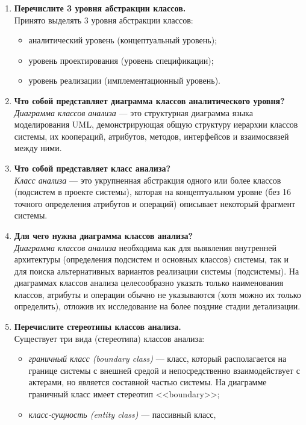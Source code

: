 \begin{enumerate}
	\item \textbf{Перечислите 3 уровня абстракции классов.}\\
		Принято выделять 3 уровня абстракции классов:
		\begin{itemize}
			\item аналитический уровень (концептуальный уровень);
			\item уровень проектирования (уровень спецификации);
			\item уровень реализации (имплементационный уровень).
		\end{itemize}
	\item \textbf{Что собой представляет диаграмма классов
		аналитического уровня?}\\
		\textit{Диаграмма классов анализа} --- это структурная диаграмма языка
		моделирования UML, демонстрирующая общую структуру иерархии классов
		системы, их коопераций, атрибутов, методов, интерфейсов
		и взаимосвязей между ними.
	\item \textbf{Что собой представляет класс анализа?}\\
		\textit{Класс анализа} --- это укрупненная абстракция одного
		или более классов (подсистем в проекте системы),
		которая на концептуальном уровне
		(без 16 точного определения атрибутов и операций)
		описывает некоторый фрагмент системы.
	\item \textbf{Для чего нужна диаграмма классов анализа?}\\
		\textit{Диаграмма классов анализа} необходима как для выявления
		внутренней архитектуры (определения подсистем и основных классов)
		системы, так и для поиска альтернативных вариантов реализации системы
		(подсистемы). На диаграммах классов анализа целесообразно указать
		только наименования классов, атрибуты и операции обычно не указываются
		(хотя можно их только определить), отложив их исследование
		на более поздние стадии детализации.
	\item \textbf{Перечислите стереотипы классов анализа.}\\
		Существует три вида (стереотипа) классов анализа:
		\begin{itemize}
			\item \textit{граничный класс (boundary class)} --- класс,
				который располагается на границе системы с внешней средой
				и непосредственно взаимодействует с актерами, но является
				составной частью системы.
				На диаграмме граничный класс имеет стереотип <<boundary>>;
			\item \textit{класс-сущность (entity class)} --- пассивный класс,

\end{itemize}
\end{enumerate}
